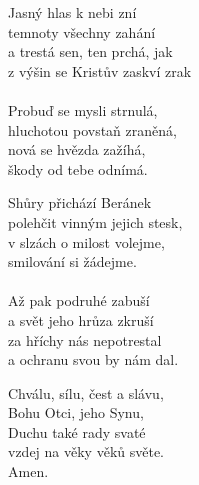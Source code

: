 \begin{translatioMulticol}{3}
Jasný hlas k nebi zní\\
temnoty všechny zahání\\
a trestá sen, ten prchá, jak\\
z výšin se Kristův zaskví zrak\\
\\
Probuď se mysli strnulá,\\
hluchotou povstaň zraněná,\\
nová se hvězda zažíhá,\\
škody od tebe odnímá.\columnbreak

Shůry přichází Beránek\\
polehčit vinným jejich stesk,\\
v slzách o milost volejme,\\
smilování si žádejme.\\
\\
Až pak podruhé zabuší\\
a svět jeho hrůza zkruší\\
za hříchy nás nepotrestal\\
a ochranu svou by nám dal.\columnbreak

Chválu, sílu, čest a slávu,\\
Bohu Otci, jeho Synu,\\
Duchu také rady svaté\\
vzdej na věky věků světe.\\
Amen.
\end{translatioMulticol}
